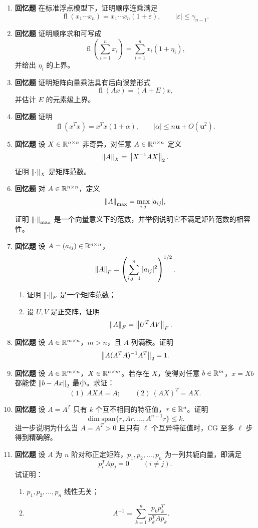 \documentclass{article}
\newcommand{\fl}{\operatorname{fl}}
\newcommand{\oldtag}{\textcolor{red!65!black}{\textbf{回忆题}}}
\begin{document}
\begin{enumerate}
  \item \oldtag{} 在标准浮点模型下，证明顺序连乘满足
  \[
    \fl(x_1\cdots x_n)=x_1\cdots x_n(1+\varepsilon),\qquad
    |\varepsilon|\le\gamma_{n-1}.
  \]

  \item \oldtag{} 证明顺序求和可写成
  \[
    \fl\left(\sum_{i=1}^n x_i\right)=\sum_{i=1}^n x_i(1+\eta_i),
  \]
  并给出 $\eta_i$ 的上界。

  \item \oldtag{} 证明矩阵向量乘法具有后向误差形式
  \[
    \fl(Ax)=(A+E)x,
  \]
  并估计 $E$ 的元素级上界。

  \item \oldtag{} 证明
  \[
    \fl(x^Tx)=x^Tx(1+\alpha),\qquad |\alpha|\le n\mathbf u+O(\mathbf u^2).
  \]

  \item \oldtag{} 设 $X\in\mathbb{R}^{n\times n}$ 非奇异，对任意 $A\in\mathbb{R}^{n\times n}$ 定义
  \[
    \left\| A \right\|_X=\left\| X^{-1}AX \right\|_2.
  \]
  证明 $\left\| \cdot \right\|_X$ 是矩阵范数。

  \item \oldtag{} 对 $A\in\mathbb{R}^{n\times n}$，定义
  \[
    \left\| A \right\|_{\max}=\max_{i,j}|a_{ij}|,
  \]
  证明 $\left\| \cdot \right\|_{\max}$ 是一个向量意义下的范数，并举例说明它不满足矩阵范数的相容性。

  \item \oldtag{} 设 $A=(a_{ij})\in\mathbb{R}^{n\times n}$，
  \[
    \left\| A \right\|_F=\left(\sum_{i,j=1}^n |a_{ij}|^2\right)^{1/2}.
  \]
  \begin{enumerate}[(1)]
    \item 证明 $\left\| \cdot \right\|_F$ 是一个矩阵范数；
    \item 设 $U,V$ 是正交阵，证明
    \[
      \left\| A \right\|_F=\left\| U^TAV \right\|_F.
    \]
  \end{enumerate}

  \item \oldtag{} 设 $A\in\mathbb{R}^{m\times n}$，$m>n$，且 $A$ 列满秩。证明
  \[
    \left\| A(A^TA)^{-1}A^T \right\|_2=1.
  \]

  \item \oldtag{} 设 $A\in\mathbb{R}^{m\times n}$，$X\in\mathbb{R}^{n\times m}$。若存在 $X$，使得对任意
  $b\in\mathbb{R}^m$，$x=Xb$ 都能使 $\left\| b-Ax \right\|_2$ 最小。求证：
  \[
    (1)\ AXA=A;\qquad (2)\ (AX)^T=AX.
  \]

  \item \oldtag{} 设 $A=A^T$ 只有 $k$ 个互不相同的特征值，$r\in\mathbb{R}^n$。证明
  \[
    \dim\mathrm{span}\{r,Ar,\dots,A^{n-1}r\}\le k.
  \]
  进一步说明为什么当 $A=A^T>0$ 且只有 $\ell$ 个互异特征值时，CG 至多 $\ell$ 步得到精确解。

  \item \oldtag{} 设 $A$ 为 $n$ 阶对称正定矩阵，$p_1,p_2,\dots,p_n$ 为一列共轭向量，即满足
  \[
    p_i^TAp_j=0\qquad(i\ne j).
  \]
  试证明：
  \begin{enumerate}[(1)]
    \item $p_1,p_2,\dots,p_n$ 线性无关；
    \item
    \[
      A^{-1}=\sum_{k=1}^n\frac{p_kp_k^T}{p_k^TAp_k}.
    \]
  \end{enumerate}
\end{enumerate}
\end{document}
